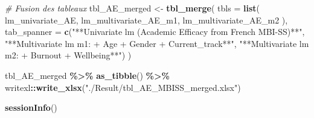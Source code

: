 \documentclass[
]{article}
\newenvironment{Shaded}{\begin{snugshade}}{\end{snugshade}}
\newcommand{\AttributeTok}[1]{\textcolor[rgb]{0.13,0.29,0.53}{#1}}
\newcommand{\CommentTok}[1]{\textcolor[rgb]{0.56,0.35,0.01}{\textit{#1}}}
\newcommand{\FunctionTok}[1]{\textcolor[rgb]{0.13,0.29,0.53}{\textbf{#1}}}
\newcommand{\NormalTok}[1]{#1}
\newcommand{\OtherTok}[1]{\textcolor[rgb]{0.56,0.35,0.01}{#1}}
\newcommand{\SpecialCharTok}[1]{\textcolor[rgb]{0.81,0.36,0.00}{\textbf{#1}}}
\newcommand{\StringTok}[1]{\textcolor[rgb]{0.31,0.60,0.02}{#1}}
\begin{document}
\begin{Shaded}
\begin{Highlighting}[]
\CommentTok{\# Fusion des tableaux}
\NormalTok{tbl\_AE\_merged }\OtherTok{\textless{}{-}} \FunctionTok{tbl\_merge}\NormalTok{(}
  \AttributeTok{tbls =} \FunctionTok{list}\NormalTok{(}
\NormalTok{    lm\_univariate\_AE,}
\NormalTok{    lm\_multivariate\_AE\_m1,}
\NormalTok{    lm\_multivariate\_AE\_m2}
\NormalTok{  ),}
  \AttributeTok{tab\_spanner =} \FunctionTok{c}\NormalTok{(}\StringTok{"**Univariate lm (Academic Efficacy from \textquotesingle{}French MBI{-}SS\textquotesingle{})**"}\NormalTok{,}
                  \StringTok{"**Multivariate lm m1: + Age + Gender + Current\_track**"}\NormalTok{,}
                  \StringTok{"**Multivariate lm m2: + Burnout + Wellbeing**"}\NormalTok{)}
\NormalTok{)}

\NormalTok{tbl\_AE\_merged  }\SpecialCharTok{\%\textgreater{}\%}  \FunctionTok{as\_tibble}\NormalTok{() }\SpecialCharTok{\%\textgreater{}\%}
\NormalTok{  writexl}\SpecialCharTok{::}\FunctionTok{write\_xlsx}\NormalTok{(}\StringTok{"./Result/tbl\_AE\_MBISS\_merged.xlsx"}\NormalTok{)}
\end{Highlighting}
\end{Shaded}

\begin{Shaded}
\begin{Highlighting}[]
\FunctionTok{sessionInfo}\NormalTok{()}
\end{Highlighting}
\end{Shaded}
\end{document}
